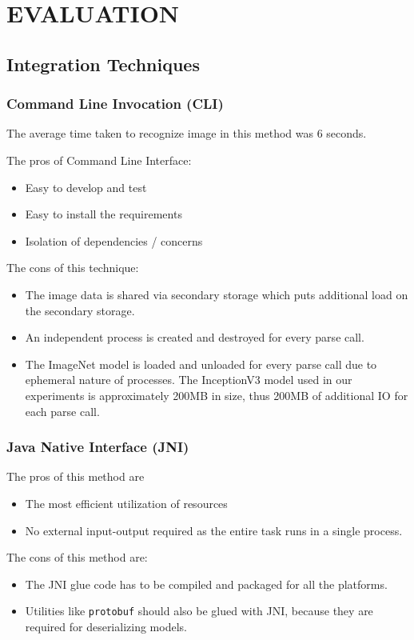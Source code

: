 \section {EVALUATION} \label{sec:evaluation}
\subsection{Integration Techniques}
\subsubsection{Command Line Invocation (CLI)} \label{sec:eval-cli}
The average time taken to recognize image in this method was 6 seconds.

The pros of Command Line Interface:
\begin{itemize}
\item Easy to develop and test
\item Easy to install the requirements
\item Isolation of dependencies / concerns
\end{itemize}

The cons of this technique:
\begin{itemize}
\item The image data is shared via secondary storage which puts additional load on the  secondary storage.
\item An independent process is created and destroyed for every parse call.
\item The ImageNet model is loaded and unloaded for every parse call due to ephemeral nature of processes. The InceptionV3 model used in our experiments is approximately 200MB in size, thus 200MB of additional IO for each parse call.
\end{itemize}

\subsubsection{Java Native Interface (JNI)} \label{sec:eval-jni}

The pros of this method are
\begin{itemize}
\item The most efficient utilization of resources
\item No external input-output required as the entire task runs in a single process.
\end{itemize}

The cons of this method are:
\begin{itemize}
  \item The JNI glue code has to be compiled and packaged for all the platforms.
  \item Utilities like \texttt{protobuf} should also be glued with JNI, because they are required for deserializing models\cite{javacpp-240}.
\end{itemize}

